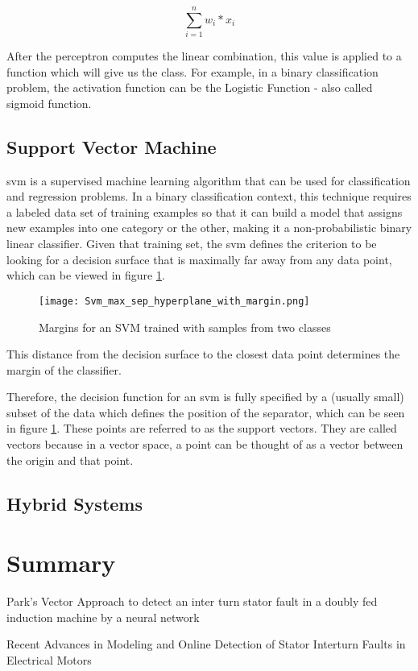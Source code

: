 \begin{equation} 
\label{eq:linear_combination}
\sum_{i=1}^{n} w_{i}*x_{i}
\end{equation}

After the perceptron computes the linear combination, this value is applied to a function which will give us the class. For example, in a binary classification problem, the activation function can be the Logistic Function - also called sigmoid function.

\subsection{Support Vector Machine} %
\label{sec:svm}

\Acrfull{svm} is a supervised machine learning algorithm that can be used for classification and regression problems. In a binary classification context, this technique requires a labeled data set of training examples so that it can build a model that assigns new examples into one category or the other, making it a non-probabilistic binary linear classifier.
Given that training set, the \Acrshort{svm} defines the criterion to be looking for a decision surface that is maximally far away from any data point, which can be viewed in figure \ref{fig:svm_margin}. 

\begin{figure}[htpb]
\centering
\texttt{[image: Svm\_max\_sep\_hyperplane\_with\_margin.png]}
\caption{Margins for an SVM trained with samples from two classes}
\label{fig:svm_margin}
\end{figure}

This distance from the decision surface to the closest data point determines the margin of the classifier.

Therefore, the decision function for an \Acrshort{svm} is fully specified by a (usually small) subset of the data which defines the position of the separator, which can be seen in figure \ref{fig:svm_margin}. These points are referred to as the support vectors. They are called vectors because in a vector space, a point can be thought of as a vector between the origin and that point.

\subsection{Hybrid Systems} %
\label{sec:other_approaches}






\section{Summary} %
\label{sec:related_work_summary}


Park’s Vector Approach to detect an inter turn stator fault in a doubly fed induction machine by a neural network 

Recent Advances in Modeling and Online Detection of Stator Interturn Faults in Electrical Motors

